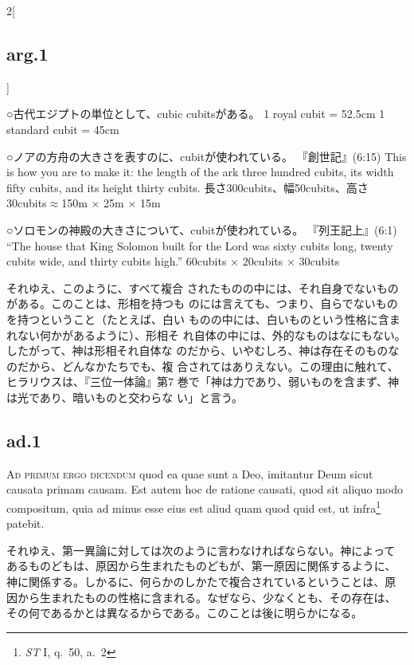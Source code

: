 \documentclass[paper=a4paper,fontsize=10pt,jafontsize=9pt,titlepage]{jlreq}
\begin{document}
\begin{paracol}{2}[\subsection{arg.1}]
{\switchcolumn*

○古代エジプトの単位として、cubic cubitsがある。
1 royal cubit = 52.5cm
1 standard cubit = 45cm



○ノアの方舟の大きさを表すのに、cubitが使われている。
『創世記』(6:15)
This is how you are to make it: the length of the ark three hundred
 cubits, its width fifty cubits, and its height thirty cubits. 
長さ300cubits、幅50cubits、高さ30cubits$\approx$150m $\times$ 25m $\times$ 15m



○ソロモンの神殿の大きさについて、cubitが使われている。
『列王記上』(6:1)
``The house that King Solomon built for the Lord was sixty cubits long,
 twenty cubits wide, and thirty cubits high.''
60cubits $\times$ 20cubits $\times$ 30cubits
}それゆえ、このように、すべて複合
 されたものの中には、それ自身でないものがある。このことは、形相を持つも
 のには言えても、つまり、自らでないものを持つということ（たとえば、白い
 ものの中には、白いものという性格に含まれない何かがあるように）、形相そ
 れ自体の中には、外的なものはなにもない。したがって、神は形相それ自体な
 のだから、いやむしろ、神は存在そのものなのだから、どんなかたちでも、複
 合されてはありえない。この理由に触れて、ヒラリウスは、『三位一体論』第7
 巻で「神は力であり、弱いものを含まず、神は光であり、暗いものと交わらな
 い」と言う。

\subsection{ad.1}

{\scshape Ad primum ergo dicendum} quod ea quae sunt a Deo, imitantur
Deum sicut causata primam causam. Est autem hoc de ratione causati,
quod sit aliquo modo compositum, quia ad minus esse eius est aliud
quam quod quid est, ut infra\footnote{{\itshape ST} I, q.~50, a.~2}
patebit.

\switchcolumn

それゆえ、第一異論に対しては次のように言わなければならない。神によって
あるものどもは、原因から生まれたものどもが、第一原因に関係するように、
神に関係する。しかるに、何らかのしかたで複合されているということは、原
因から生まれたものの性格に含まれる。なぜなら、少なくとも、その存在は、
その何であるかとは異なるからである。このことは後に明らかになる。

\switchcolumn*[\subsection{ad.2}]


\end{paracol}
\end{document}
